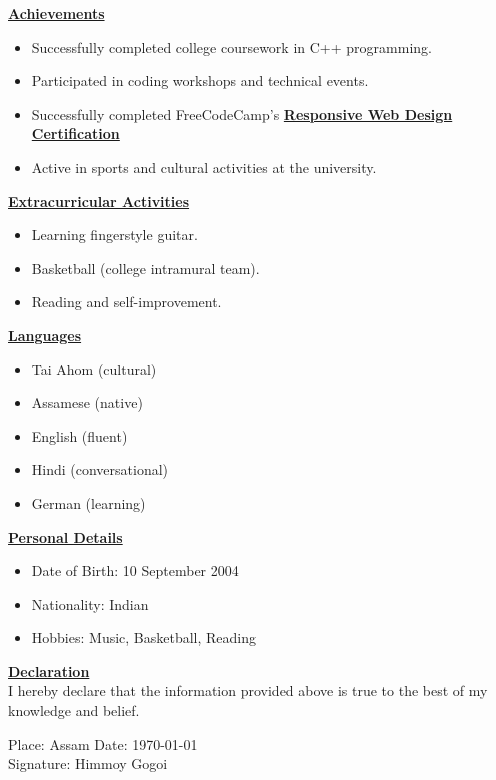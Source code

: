 \documentclass[11pt,a4paper]{article}
\begin{document}
\vspace{8pt}
\noindent\underline{\textbf{Achievements}}
\begin{itemize}
    \item Successfully completed college coursework in C++ programming.
    \item Participated in coding workshops and technical events.
    \item Successfully completed FreeCodeCamp's \href{https://www.freecodecamp.org/certification/fcc-6a6c0306-18b6-448a-b067-86a66700f30c/responsive-web-design}{\textbf{Responsive Web 
    Design Certification}}
    \item Active in sports and cultural activities at the university.
\end{itemize}

\vspace{8pt}
\noindent\underline{\textbf{Extracurricular Activities}}
\begin{itemize}
    \item Learning fingerstyle guitar.
    \item Basketball (college intramural team).
    \item Reading and self-improvement.
\end{itemize}

\vspace{8pt}
\noindent\underline{\textbf{Languages}}
\begin{itemize}
    \item Tai Ahom (cultural)
    \item Assamese (native)
    \item English (fluent)
    \item Hindi (conversational)
    \item German (learning)
\end{itemize}

\vspace{8pt}
\noindent\underline{\textbf{Personal Details}}
\begin{itemize}
    \item Date of Birth: 10 September 2004
    \item Nationality: Indian
    \item Hobbies: Music, Basketball, Reading
\end{itemize}

\vspace{8pt}
\noindent\underline{\textbf{Declaration}}\\
I hereby declare that the information provided above is true to the best of my knowledge and belief.

\vspace{12pt}
\noindent Place: Assam \hfill Date: \today \\
Signature: Himmoy Gogoi
\end{document}
